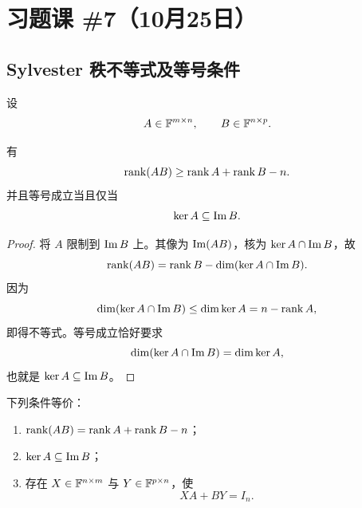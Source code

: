 \section{习题课 \#7（10月25日）}

\subsection{Sylvester 秩不等式及等号条件}

设
\begin{equation}
 A\in\mathbb F^{m\times n},
 \qquad
 B\in\mathbb F^{n\times p}.
\end{equation}

\begin{theorem}
有
\begin{equation}
 \operatorname{rank}(AB)\geq\operatorname{rank} A+\operatorname{rank} B-n.
\end{equation}
并且等号成立当且仅当
\begin{equation}
 \operatorname{ker} A\subseteq\operatorname{Im} B.
\end{equation}
\end{theorem}

\begin{proof}
将 $A$ 限制到 $\operatorname{Im} B$ 上。其像为 $\operatorname{Im}(AB)$，核为 $\operatorname{ker} A\cap\operatorname{Im} B$，故
\begin{equation}
 \operatorname{rank}(AB)
 =\operatorname{rank} B-\dim(\operatorname{ker} A\cap\operatorname{Im} B).
\end{equation}
因为
\begin{equation}
 \dim(\operatorname{ker} A\cap\operatorname{Im} B)\leq\dim\operatorname{ker} A=n-\operatorname{rank} A,
\end{equation}
即得不等式。等号成立恰好要求
\begin{equation}
 \dim(\operatorname{ker} A\cap\operatorname{Im} B)=\dim\operatorname{ker} A,
\end{equation}
也就是 $\operatorname{ker} A\subseteq\operatorname{Im} B$。
\end{proof}

\begin{corollary}
下列条件等价：
\begin{enumerate}
  \item $\operatorname{rank}(AB)=\operatorname{rank} A+\operatorname{rank} B-n$；
  \item $\operatorname{ker} A\subseteq\operatorname{Im} B$；
  \item 存在 $X\in\mathbb F^{n\times m}$ 与 $Y\in\mathbb F^{p\times n}$，使
  \begin{equation}
   XA+BY=I_n.
  \end{equation}
\end{enumerate}
\end{corollary}

